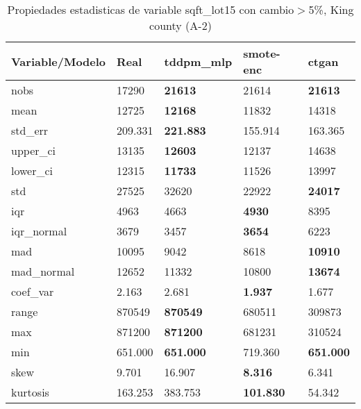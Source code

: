 \begin{table}[H]
\centering
\fontsize{8}{14}\selectfont
\caption{Propiedades estadisticas de variable sqft\_lot15 con cambio\ensuremath{>}5\%, King county (A-2)}
\label{table-stats-king county-a-2-sqft_lot15-short}
\begin{tabular}{|l|m{10em}|m{10em}|m{10em}|m{10em}|}
\hline
 \rowcolor[gray]{0.8}
Variable/Modelo & Real & tddpm\_mlp & smote-enc & ctgan \\
\hline nobs & 17290 & \bfseries 21613 & \cellcolor[rgb]{0.9, 0.54, 0.52} 21614 & \bfseries 21613 \\
\hline mean & 12725 & \bfseries 12168 & 11832 & \cellcolor[rgb]{0.9, 0.54, 0.52} 14318 \\
\hline std\_err & 209.331 & \bfseries 221.883 & \cellcolor[rgb]{0.9, 0.54, 0.52} 155.914 & 163.365 \\
\hline upper\_ci & 13135 & \bfseries 12603 & 12137 & \cellcolor[rgb]{0.9, 0.54, 0.52} 14638 \\
\hline lower\_ci & 12315 & \bfseries 11733 & 11526 & \cellcolor[rgb]{0.9, 0.54, 0.52} 13997 \\
\hline std & 27525 & \cellcolor[rgb]{0.9, 0.54, 0.52} 32620 & 22922 & \bfseries 24017 \\
\hline iqr & 4963 & 4663 & \bfseries 4930 & \cellcolor[rgb]{0.9, 0.54, 0.52} 8395 \\
\hline iqr\_normal & 3679 & 3457 & \bfseries 3654 & \cellcolor[rgb]{0.9, 0.54, 0.52} 6223 \\
\hline mad & 10095 & 9042 & \cellcolor[rgb]{0.9, 0.54, 0.52} 8618 & \bfseries 10910 \\
\hline mad\_normal & 12652 & 11332 & \cellcolor[rgb]{0.9, 0.54, 0.52} 10800 & \bfseries 13674 \\
\hline coef\_var & 2.163 & \cellcolor[rgb]{0.9, 0.54, 0.52} 2.681 & \bfseries 1.937 & 1.677 \\
\hline range & 870549 & \bfseries 870549 & 680511 & \cellcolor[rgb]{0.9, 0.54, 0.52} 309873 \\
\hline max & 871200 & \bfseries 871200 & 681231 & \cellcolor[rgb]{0.9, 0.54, 0.52} 310524 \\
\hline min & 651.000 & \bfseries 651.000 & \cellcolor[rgb]{0.9, 0.54, 0.52} 719.360 & \bfseries 651.000 \\
\hline skew & 9.701 & \cellcolor[rgb]{0.9, 0.54, 0.52} 16.907 & \bfseries 8.316 & 6.341 \\
\hline kurtosis & 163.253 & \cellcolor[rgb]{0.9, 0.54, 0.52} 383.753 & \bfseries 101.830 & 54.342 \\

\end{tabular}
\end{table}
